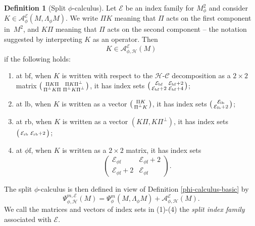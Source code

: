 \documentclass[JEP,XML,SOM,Unicode,NoFloatCountersInSection,published]{cedram}
\newenvironment{smallpmatrix}{\big(\begin{smallmatrix}}{\end{smallmatrix}\big)}
\theoremstyle{plain}
\theoremstyle{definition}
\newtheorem{defn}[Th]{Definition}
\newcommand\calA{{\mathcal A}}
\newcommand\calE{{\mathcal E}}
\newcommand{\phif}{{\phi\mathrm{f}}}
\newcommand{\lf}{{\mathrm{lb}}}
\newcommand{\rf}{{\mathrm{rb}}}
\newcommand{\bbf}{{\mathrm{bf}}}
\begin{document}
\begin{defn}[Split $\phi$-calculus] \label{def:split phi calc}
Let $\calE$ be an index family for $M^2_\phi$ and consider
$
K\in \calA^\calE_\phi(M,\Lambda_\phi M).
$
We write $\Pi K$ meaning that $\Pi$ acts on the first component in~$M^2$,
and $K\Pi$ meaning that $\Pi$ acts on the second component -- the notation suggested by
interpreting $K$ as an operator. Then
\[
K \in \calA^\calE_{\phi,\mathscr{H}}(M)
\]
if the following holds:
\begin{enumerate}
\item
at $\bbf$, when $K$ is written with respect to the $\mathscr{H}$-$\mathscr{C}$ decomposition as a $2\times2$ matrix $
\begin{smallpmatrix}
\Pi K\Pi & \Pi K \Pi^\perp \\ \Pi^\perp K \Pi & \Pi^\perp K \Pi^\perp
\end{smallpmatrix}
$, it has index sets
$\begin{smallpmatrix}
\calE_\bbf & \calE_\bbf+2 \\ \calE_\bbf+2 & \calE_\bbf+4
\end{smallpmatrix}
$;
\item
at $\lf$, when $K$ is written as a vector $
\begin{smallpmatrix}
\Pi K \\ \Pi^\perp K
\end{smallpmatrix}
$, it has index sets
$
\begin{smallpmatrix}
\calE_\lf \\ \calE_\lf+2
\end{smallpmatrix}
$;
\item
at $\rf$, when $K$ is written as a vector $(K\Pi,K\Pi^\perp)$, it has index sets
$
\begin{smallpmatrix}
\calE_\rf & \calE_\rf+2
\end{smallpmatrix}
$;
\item
at $\phif$, when $K$ is written as a $2\times 2$ matrix, it has index sets
\[
\begin{pmatrix}
\calE_\phif & \calE_\phif+2 \\ \calE_\phif+2 & \calE_\phif
\end{pmatrix}.
\]
\end{enumerate}
The split $\phi$-calculus is then defined in view of Definition \ref{phi-calculus-basic} by
\[
\Psi^{m,\calE}_{\phi, \mathscr{H}}(M) = \Psi^{m}_\phi(M, \Lambda_\phi M) + \calA^\calE_{\phi,\mathscr{H}}(M).
\]
We call the matrices and vectors of index sets in (1)-(4) the \textit{split index family} associated with $\calE$.
\end{defn}
\end{document}
